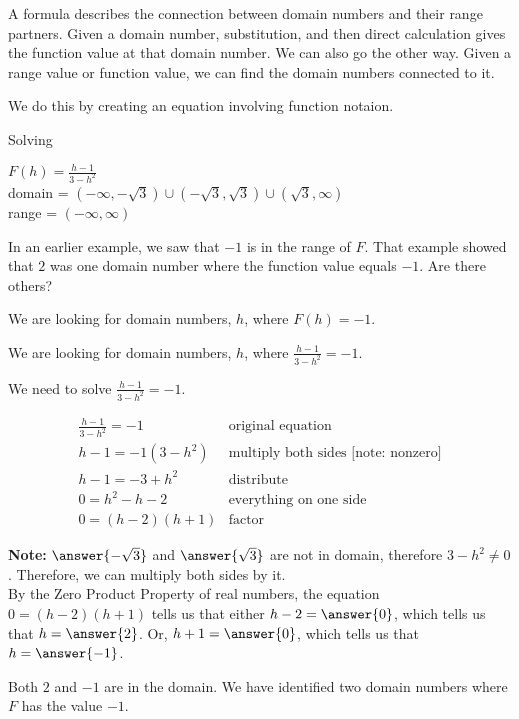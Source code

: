\documentclass{ximera}
\begin{document}
A formula describes the connection between domain numbers and their range partners.  Given a domain number, substitution, and then direct calculation gives the function value at that domain number.  We can also go the other way.  Given a range value or function value, we can find the domain numbers connected to it.

We do this by creating an equation involving function notaion.














\newpage

\begin{example}   Solving 

$F(h) = \frac{h-1}{3-h^2}$ \\
domain = $(-\infty, -\sqrt{3}) \cup (-\sqrt{3}, \sqrt{3}) \cup (\sqrt{3}, \infty)$ \\
range = $(-\infty, \infty)$


In an earlier example, we saw that $-1$ is in the range of $F$.  That example showed that $2$ was one domain number where the function value equals $-1$. Are there others?



\begin{explanation}


We are looking for domain numbers, $h$, where $F(h) = -1$.  

We are looking for domain numbers, $h$, where $\frac{h-1}{3-h^2} = -1$.  

We need to solve $\frac{h-1}{3-h^2} = -1$.



\[
\begin{array}{ll}
\frac{h-1}{3-h^2} = -1 &  \text{original equation} \\
h - 1 = -1 (3-h^2)    &  \text{multiply both sides [note: nonzero]} \\
h - 1 = -3 + h^2    &      \text{distribute} \\
0 = h^2 - h - 2    &      \text{everything on one side} \\
0 =(h-2)(h+1)    &   \text{factor}   
\end{array}
\]



\textbf{Note:}  $\answer{-\sqrt{3}}$ and $\answer{\sqrt{3}}$ are not in domain, therefore $3 - h^2 \ne 0$. Therefore, we can multiply both sides by it.  \\



By the Zero Product Property of real numbers, the equation $0 =(h-2)(h+1)$ tells us that either $h-2 = \answer{0}$, which tells us that $h = \answer{2}$. Or, $h+1 = \answer{0}$, which tells us that $h = \answer{-1}$.

Both $2$ and $-1$ are in the domain.  We have identified two domain numbers where $F$ has the value $-1$.


\end{explanation}
\end{example}
\end{document}

